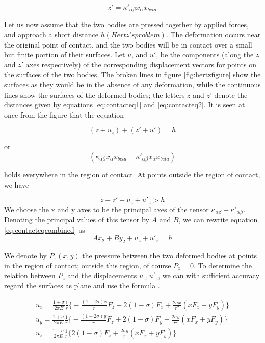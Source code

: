 \begin{equation}
z' = \kappa'_{\alpha\beta}x_{\alpha}x_{beta}
\label{eq:contacteq2}
\end{equation}

Let us now assume that the two bodies are pressed together by applied
forces, and approach a short distance $h(Hertz’s problem)$. The deformation occurs near the original point of contact, and the two bodies will be in contact over a small but finite portion of their surfaces. Let $u$, and $u'$, be the components (along the $z$ and $z'$ axes respectively) of the corresponding displacement vectors for points on the surfaces of the two bodies. The broken lines in figure \ref{fig:hertzfigure} show the surfaces as they would be in the absence of any deformation, while the continuous lines show the surfaces of the deformed bodies; the letters $z$ and $z’$ denote the distances given by equations \ref{eq:contacteq1}
and \ref{eq:contacteq2}. It is seen at once from the figure that the equation

\begin{equation}
(z+u_{z}) + (z'+u') = h
\end{equation}

or 
\begin{equation}
(\kappa_{\alpha\beta}x_{\alpha}x_{beta} + \kappa'_{\alpha\beta}x_{\alpha}x_{beta})
\label{eq:contacteqcombined}
\end{equation}

holds everywhere in the region of contact. At points outside the region of
contact, we have

\begin{equation}
z+z'+u_{z}+u'_{z} > h
\end{equation}
We choose the x and y axes to be the principal axes of the tensor $\kappa_{\alpha\beta}+\kappa'_{\alpha\beta}$. Denoting the principal values of this tensor by $A$ and $B$, we can rewrite equation \ref{eq:contacteqcombined} as
\begin{equation}
Ax_{2}+By_{2}+u_{z}+u'_{z} = h
\label{eq:rewriteAB}
\end{equation}

We denote by $P_{z}(x,y)$ the pressure between the two deformed bodies at points in the region of contact; outside this region, of course $P_{z} = 0$. To determine the relation between $P_{z}$ and the displacements $u_{z}, u'_{z}$, we can with sufficient accuracy regard the surfaces as plane and use the formula \citep{landau}.
 
\begin{equation}
\begin{split}
u_{x} = \frac{1+\sigma}{2 \pi E} \frac{1}{r} \Big\{ -\frac{(1-2\sigma)x}{r}F_{z} + 2(1-\sigma)F_{x} + \frac{2\sigma x}{r^{2}} (xF_{x} + yF_{y}) \Big\} \\
u_{y} = \frac{1+\sigma}{2 \pi E} \frac{1}{r} \Big\{ -\frac{(1-2\sigma)y}{r}F_{z} + 2(1-\sigma)F_{y} + \frac{2\sigma y}{r^{2}} (xF_{x} + yF_{y}) \Big\} \\
u_{z} = \frac{1+\sigma}{2 \pi E} \frac{1}{r} \Big\{ 2(1-\sigma)F_{z} + \frac{2\sigma y}{r} (xF_{x} + yF_{y}) \Big\} \\
\end{split}
\label{eq:landau}
\end{equation}


